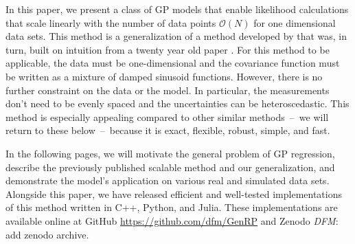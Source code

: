 \documentclass[manuscript, letterpaper]{aastex6}
\makeatletter
\let\origsection\section
\renewcommand\section{\@ifstar{\starsection}{\nostarsection}}
\newcommand\nostarsection[1]{\sectionprelude\origsection{#1}}
\newcommand\starsection[1]{\sectionprelude\origsection*{#1}}
\newcommand\sectionprelude{\vspace{1em}}
\newcommand{\project}[1]{\textsf{#1}}
\newcommand{\todo}[3]{{\color{#2}\emph{#1}: #3}}
\newcommand{\dfmtodo}[1]{\todo{DFM}{red}{#1}}
\makeatother
\begin{document}
In this paper, we present a class of GP models that enable likelihood
calculations that scale linearly with the number of data points
$\mathcal{O}(N)$ for one dimensional data sets.
This method is a generalization of a method developed by
\citet{Ambikasaran:2015} that was, in turn, built on intuition from a twenty
year old paper \citep{Rybicki:1995}.
For this method to be applicable, the data must be one-dimensional and the
covariance function must be written as a mixture of damped sinusoid functions.
However, there is no further constraint on the data or the model.
In particular, the measurements don't need to be evenly spaced and the
uncertainties can be heteroscedastic.
This method is especially appealing compared to other similar methods~--~we
will return to these below~--~because it is exact, flexible, robust, simple,
and fast.

In the following pages, we will motivate the general problem of GP regression,
describe the previously published scalable method \citep{Rybicki:1995,
Ambikasaran:2015} and our generalization, and demonstrate the model's
application on various real and simulated data sets.
Alongside this paper, we have released efficient and well-tested
implementations of this method written in \project{C++}, \project{Python}, and
\project{Julia}.
These implementations are available online at \project{GitHub}
\url{https://github.com/dfm/GenRP} and \project{Zenodo} \dfmtodo{add zenodo
archive}.

%
%

\section{Gaussian processes}
\end{document}
